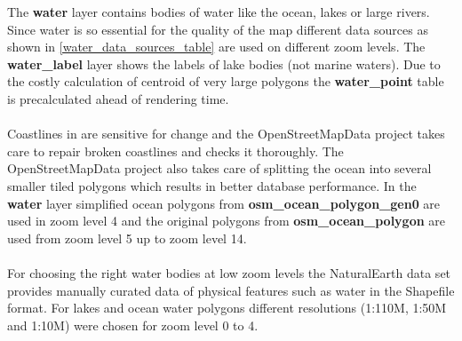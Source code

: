 \noindent\begin{minipage}[t]{0.48\linewidth}
    \vspace{0pt}
    The \textbf{water} layer contains bodies of water like the ocean, lakes or large rivers.
    Since water is so essential for the quality of the map different data sources as shown in \autoref{water_data_sources_table} are used on different zoom levels. 
    The \textbf{water\_label} layer shows the labels of lake bodies (not marine waters). Due to the costly calculation of centroid of very large polygons the \textbf{water\_point} table is precalculated ahead of rendering time.
    \\\\
    Coastlines in \osm{} are sensitive for change and
    the OpenStreetMapData\cite{14_openstreetmapdata.com_2015}
    project takes care to repair broken coastlines and checks it thoroughly. The OpenStreetMapData project also takes care of splitting the ocean into several smaller tiled polygons which results in better database performance.
    In the \textbf{water} layer simplified ocean polygons from \textbf{osm\_ocean\_polygon\_gen0} are used in zoom level 4 and the original polygons from \textbf{osm\_ocean\_polygon} are used from zoom level 5 up to zoom level 14.
    \\\\
    For choosing the right water bodies at low zoom levels the NaturalEarth data set \cite{16_naturalearthdata.com_2015} provides manually curated data of physical features such as water in the Shapefile format. For lakes and ocean water polygons different resolutions (1:110M, 1:50M and 1:10M) were chosen for zoom level 0 to 4.
\end{minipage}
\hfill
